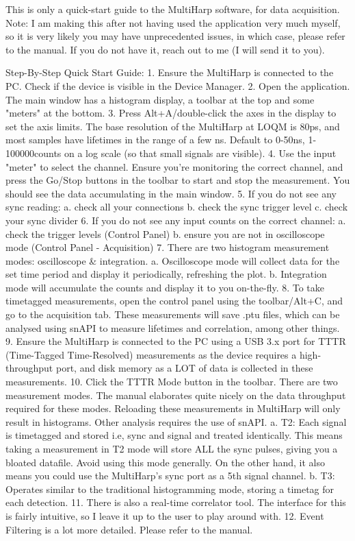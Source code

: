 This is only a quick-start guide to the MultiHarp software, for data acquisition. 
Note: I am making this after not having used the application very much myself, so it is very likely you may have unprecedented issues, in which case, please refer to the manual. If you do not have it, reach out to me (I will send it to you). 

Step-By-Step Quick Start Guide:
1. Ensure the MultiHarp is connected to the PC. Check if the device is visible in the Device Manager. 
2. Open the application. The main window has a histogram display, a toolbar at the top and some "meters" at the bottom. 
3. Press Alt+A/double-click the axes in the display to set the axis limits. The base resolution of the MultiHarp at LOQM is 80ps, and most samples have lifetimes in the range of a few ns. Default to 0-50ns, 1-100000counts on a log scale (so that small signals are visible).
4. Use the input "meter" to select the channel. Ensure you're monitoring the correct channel, and press the Go/Stop buttons in the toolbar to start and stop the measurement. You should see the data accumulating in the main window. 
5. If you do not see any sync reading:
    a. check all your connections
    b. check the sync trigger level
    c. check your sync divider
6. If you do not see any input counts on the correct channel:
    a. check the trigger levels (Control Panel)
    b. ensure you are not in oscilloscope mode (Control Panel - Acquisition)
7. There are two histogram measurement modes: oscilloscope & integration.
    a. Oscilloscope mode will collect data for the set time period and display it periodically, refreshing the plot.
    b. Integration mode will accumulate the counts and display it to you on-the-fly.
8. To take timetagged measurements, open the control panel using the toolbar/Alt+C, and go to the acquisition tab. These measurements will save .ptu files, which can be analysed using snAPI to measure lifetimes and correlation, among other things.
9. Ensure the MultiHarp is connected to the PC using a USB 3.x port for TTTR (Time-Tagged Time-Resolved) measurements as the device requires a high-throughput port, and disk memory as a LOT of data is collected in these measurements. 
10. Click the TTTR Mode button in the toolbar. There are two measurement modes. The manual elaborates quite nicely on the data throughput required for these modes. Reloading these measurements in MultiHarp will only result in histograms. Other analysis requires the use of snAPI. 
    a. T2: Each signal is timetagged and stored i.e, sync and signal and treated identically. This means taking a measurement in T2 mode will store ALL the sync pulses, giving you a bloated datafile. Avoid using this mode generally. On the other hand, it also means you could use the MultiHarp's sync port as a 5th signal channel. 
    b. T3: Operates similar to the traditional histogramming mode, storing a timetag for each detection.  
11. There is also a real-time correlator tool. The interface for this is fairly intuitive, so I leave it up to the user to play around with. 
12. Event Filtering is a lot more detailed. Please refer to the manual. 

